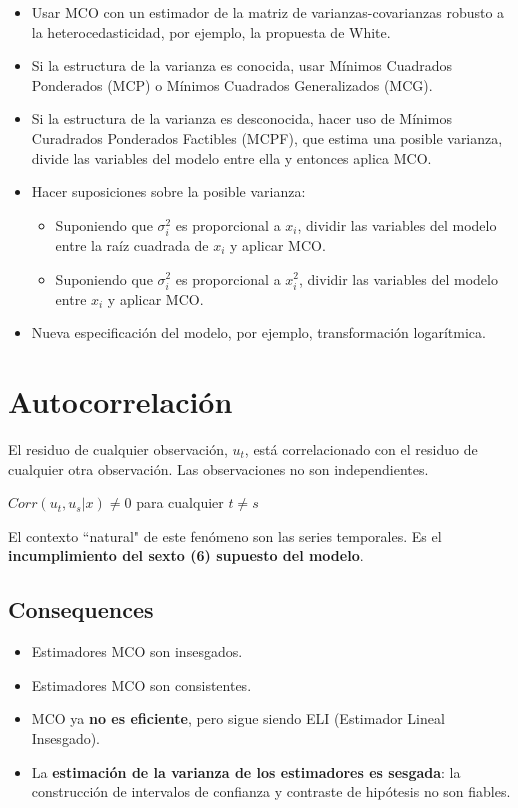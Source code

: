\documentclass[10pt, a4paper, landscape]{extarticle}
\begin{document}
\begin{multicols}{3}
\begin{itemize}[leftmargin=*]
\item Usar MCO con un estimador de la matriz de varianzas-covarianzas robusto a la heterocedasticidad, por ejemplo, la propuesta de White.
\item Si la estructura de la varianza es conocida, usar Mínimos Cuadrados Ponderados (MCP) o Mínimos Cuadrados Generalizados (MCG).
\item Si la estructura de la varianza es desconocida, hacer uso de Mínimos Curadrados Ponderados Factibles (MCPF), que estima una posible varianza, divide las variables del modelo entre ella y entonces aplica MCO.
\item Hacer suposiciones sobre la posible varianza:
\begin{itemize}[leftmargin=*]
\item Suponiendo que $\sigma_i^2$ es proporcional a $x_i$, dividir las variables del modelo entre la raíz cuadrada de $x_i$ y aplicar MCO.
\item Suponiendo que $\sigma_i^2$ es proporcional a $x_i^2$, dividir las variables del modelo entre $x_i$ y aplicar MCO.
\end{itemize}
\item Nueva especificación del modelo, por ejemplo, transformación logarítmica.
\end{itemize}

\columnbreak

\section*{Autocorrelación}

El residuo de cualquier observación, $u_t$, está correlacionado con el residuo de cualquier otra observación. Las observaciones no son independientes.

\begin{center}
$Corr(u_t, u_s | x) \neq 0$ para cualquier $t \neq s$
\end{center}

El contexto ``natural" de este fenómeno son las series temporales. Es el \textbf{incumplimiento del sexto (6) supuesto del modelo}.

\subsection*{Consequences}

\begin{itemize}[leftmargin=*]
\item Estimadores MCO son insesgados.
\item Estimadores MCO son consistentes.
\item MCO ya \textbf{no es eficiente}, pero sigue siendo ELI (Estimador Lineal Insesgado).
\item La \textbf{estimación de la varianza de los estimadores es sesgada}: la construcción de intervalos de confianza y contraste de hipótesis no son fiables.
\end{itemize}


\end{multicols}
\end{document}
